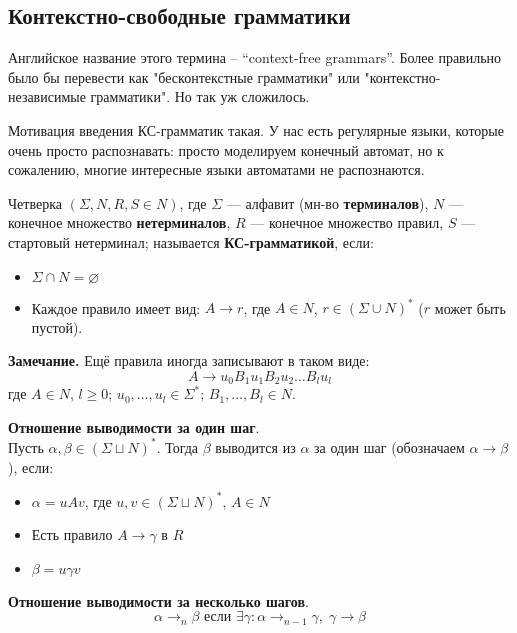 \subsection{Контекстно-свободные грамматики}

Английское название этого термина -- ``context-free grammars''. Более правильно было бы перевести как "бесконтекстные грамматики" или "контекстно-независимые грамматики". Но так уж сложилось.

Мотивация введения КС-грамматик такая. У нас есть регулярные языки, которые очень просто распознавать: просто моделируем конечный автомат, но к сожалению, многие интересные языки автоматами не распознаются.

\begin{conj}
    Четверка $(\Sigma, N, R, S \in N)$, где $\Sigma$ --- алфавит (мн-во \textbf{терминалов}), $N$ --- конечное множество \textbf{нетерминалов}, $R$ --- конечное множество правил, $S$ --- стартовый нетерминал; называется \textbf{КС-грамматикой}, если:
    \begin{itemize}
        \item $\Sigma \cap N = \varnothing$
        \item Каждое правило имеет вид: $A \to r$, 
        где $A \in N$, $r \in (\Sigma \cup N)^*$ ($r$ может быть пустой).
    \end{itemize}
\end{conj}  

\textbf{Замечание.} Ещё правила иногда записывают в таком виде:
    $$ A \to u_0 B_1 u_1 B_2 u_2 \dots B_l u_l $$
где $A \in N$, $l \geqslant 0$; $u_0, \dots, u_l \in \Sigma^*$; $B_1, \dots, B_l \in N$.

\begin{conj}
    \textbf{Отношение выводимости за один шаг}. \\ 
    Пусть $\alpha, \beta \in (\Sigma \sqcup N)^*$. Тогда $\beta$ выводится из $\alpha$ за один шаг (обозначаем $\alpha \to \beta$), если:
    \begin{itemize}
        \item $\alpha = u A v$, где $u, v \in (\Sigma \sqcup N)^*$, $A \in N$
        \item Есть правило $A \to \gamma$ в $R$
        \item $\beta = u \gamma v$
    \end{itemize}
\end{conj}

\begin{conj}
    \textbf{Отношение выводимости за несколько шагов}.
    $$ \alpha \to_n \beta \text{ если } \exists \gamma : \alpha \to_{n-1} \gamma, \; \gamma \to \beta $$
\end{conj}

